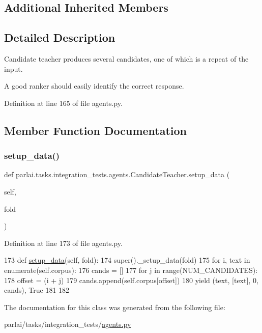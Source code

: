 \subsection*{Additional Inherited Members}


\subsection{Detailed Description}
\begin{DoxyVerb}Candidate teacher produces several candidates, one of which is a repeat of the
input.

A good ranker should easily identify the correct response.
\end{DoxyVerb}
 

Definition at line 165 of file agents.\+py.



\subsection{Member Function Documentation}
\mbox{\label{classparlai_1_1tasks_1_1integration__tests_1_1agents_1_1CandidateTeacher_a9dafcc2731525aa45337b2d6816ad9a6}} 
\subsubsection{\texorpdfstring{setup\+\_\+data()}{setup\_data()}}
{\footnotesize\ttfamily def parlai.\+tasks.\+integration\+\_\+tests.\+agents.\+Candidate\+Teacher.\+setup\+\_\+data (\begin{DoxyParamCaption}\item[{}]{self,  }\item[{}]{fold }\end{DoxyParamCaption})}



Definition at line 173 of file agents.\+py.


\begin{DoxyCode}
173     \textcolor{keyword}{def }\hyperlink{namespaceparlai_1_1tasks_1_1multinli_1_1agents_a4fa2cb0ba1ed745336ad8bceed36b841}{setup\_data}(self, fold):
174         super().\_setup\_data(fold)
175         \textcolor{keywordflow}{for} i, text \textcolor{keywordflow}{in} enumerate(self.corpus):
176             cands = []
177             \textcolor{keywordflow}{for} j \textcolor{keywordflow}{in} range(NUM\_CANDIDATES):
178                 offset = (i + j) %
179                 cands.append(self.corpus[offset])
180             \textcolor{keywordflow}{yield} (text, [text], 0, cands), \textcolor{keyword}{True}
181 
182 
\end{DoxyCode}


The documentation for this class was generated from the following file\+:\begin{DoxyCompactItemize}
\item 
parlai/tasks/integration\+\_\+tests/\hyperlink{parlai_2tasks_2integration__tests_2agents_8py}{agents.\+py}\end{DoxyCompactItemize}
